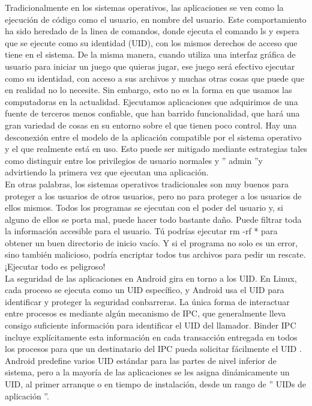 \documentclass[a4paper]{article}
\begin{document}
Tradicionalmente en los sistemas operativos, las aplicaciones se ven como la ejecución de código como el usuario, en nombre del usuario. Este comportamiento ha sido heredado de la linea de comandos, donde ejecuta el comando ls y espera que se ejecute como su identidad (UID), con los mismos derechos de acceso que tiene en el sistema. De la misma manera, cuando utiliza una interfaz gráfica de usuario para iniciar un juego que quieras jugar, ese juego será efectivo ejecutar como su identidad, con acceso a sus archivos y muchas otras cosas que puede que en realidad no lo necesite.
Sin embargo, esto no es la forma en que usamos las computadoras en la actualidad. Ejecutamos aplicaciones que adquirimos de una fuente de terceros menos confiable, que han barrido funcionalidad, que hará una gran variedad de cosas en su entorno sobre el que tienen poco control. Hay una desconexión entre el modelo de la aplicación compatible
por el sistema operativo y el que realmente está en uso. Esto puede ser mitigado
mediante estrategias tales como distinguir entre los privilegios de usuario normales y '' admin ''y advirtiendo la primera vez que ejecutan una aplicación.\\
En otras palabras, los sistemas operativos tradicionales son muy buenos para proteger a los usuarios de otros usuarios, pero no para proteger a los usuarios de ellos mismos. Todos los programas se ejecutan con el poder del usuario y, si alguno de ellos se porta mal, puede hacer todo bastante daño. Puede filtrar toda la información accesible para el usuario. Tú podrías ejecutar rm -rf * para obtener un buen directorio de inicio vacío. Y si el programa
no solo es un error, sino también malicioso, podría encriptar todos tus archivos para pedir un rescate.
¡Ejecutar todo  es peligroso!\\

La seguridad de las aplicaciones en Android gira en torno a los UID. En Linux, cada proceso
se ejecuta como un UID específico, y Android usa el UID para identificar y proteger la seguridad conbarreras. La única forma de interactuar entre procesos es mediante algún mecanismo de IPC, que generalmente lleva consigo suficiente información para identificar el UID del llamador. Binder IPC incluye explícitamente esta información en cada transacción entregada en todos los procesos para que un destinatario del IPC pueda solicitar fácilmente el UID
.
Android predefine varios UID estándar para las partes de nivel inferior de
sistema, pero a la mayoría de las aplicaciones se les asigna dinámicamente un UID, al primer arranque o en tiempo de instalación, desde un rango de '' UIDs de aplicación ''.
\end{document}
